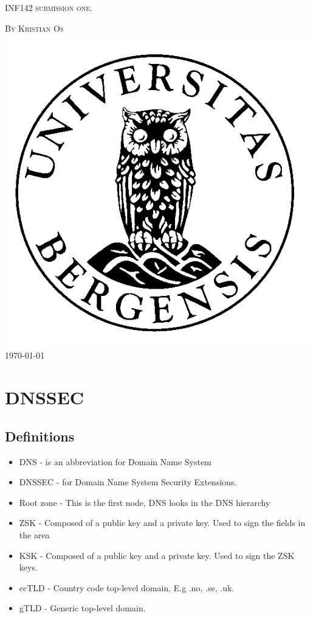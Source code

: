 \documentclass{article}
\begin{document}
	\begin{titlepage}
		\centering
		{\scshape\Large INF142 submission one.\par}
		\vspace{3em}
		{{\scshape\large By Kristian Os \par}}
        \vspace{5em}
        \includegraphics[scale=0.5]{uibLogo}
		\vfill
		\large\today
	\end{titlepage}
	\pagebreak
	\section{DNSSEC}
		\subsection{Definitions}
        \begin{itemize}
            \item DNS - is an abbreviation for Domain Name System
            \item DNSSEC - for Domain Name System Security Extensions.
            \item Root zone - This is the first node, DNS looks in the DNS hierarchy
            \item ZSK - Composed of a public key and a private key. Used to sign the fields in the area\cite{ovh}
            \item KSK - Composed of a public key and a private key. Used to sign the ZSK keys.\cite{ovh}
			\item ccTLD - Country code top-level domain, E.g .no, .se, .uk. 
            \item gTLD - Generic top-level domain.
        \end{itemize}
\end{document}
